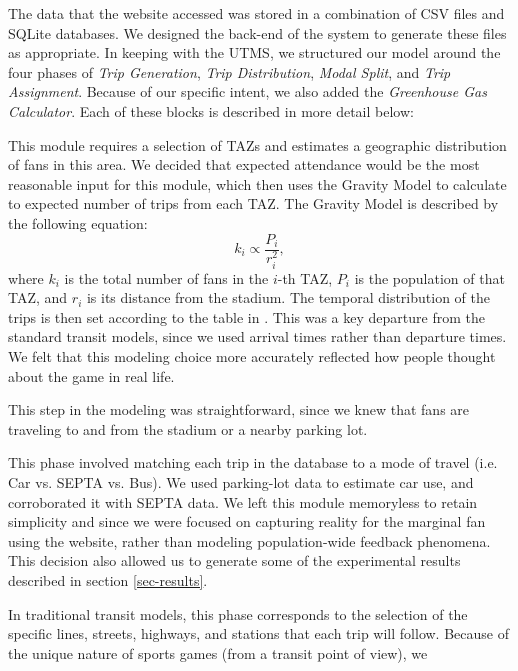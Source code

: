 The data that the website accessed was stored in a combination of
CSV files and SQLite databases. We designed the back-end of the system
to generate these files as appropriate. In keeping with the UTMS, we
structured our model around the four phases of \emph{Trip Generation},
\emph{Trip Distribution}, \emph{Modal Split}, and \emph{Trip
  Assignment}. Because of our specific intent, we also added the
\emph{Greenhouse Gas Calculator}. Each of these blocks is described in
more detail below:

\begin{description}[style=nextline]
    \item[Trip Generation] This module requires a selection of TAZs
  and estimates a geographic distribution of fans in this area. We
  decided that expected attendance would be the most reasonable input
  for this module, which then uses the Gravity Model to calculate to
  expected number of trips from each TAZ. The Gravity Model is
  described by the following equation:
  \[
    k_{i} \propto \frac{P_{i}}{r_{i}^{2}},
  \]
  where $k_{i}$ is the total number of fans in the $i$-th TAZ, $P_{i}$
  is the population of that TAZ, and $r_{i}$ is its distance from the
  stadium. The temporal distribution of the trips is then set
  according to the table in \cite{stadia-and-arenas}. This was a key
  departure from the standard transit models, since we used arrival
  times rather than departure times. We felt that this modeling choice
  more accurately reflected how people thought about the game in real
  life.
    \item[Trip Distribution] This step in the modeling was
  straightforward, since we knew that fans are traveling to and from
  the stadium or a nearby parking lot.
    \item[Mode Choice] This phase involved matching each trip in the
  database to a mode of travel (i.e. Car vs. SEPTA vs. Bus). We used
  parking-lot data to estimate car use, and corroborated it with SEPTA
  data. We left this module memoryless to retain simplicity and since
  we were focused on capturing reality for the marginal fan using the
  website, rather than modeling population-wide feedback
  phenomena. This decision also allowed us to generate some of the
  experimental results described in section \ref{sec-results}.
    \item[Trip Assignment] In traditional transit models, this phase
  corresponds to the selection of the specific lines, streets,
  highways, and stations that each trip will follow. Because of the
  unique nature of sports games (from a transit point of view), we

\end{description}
